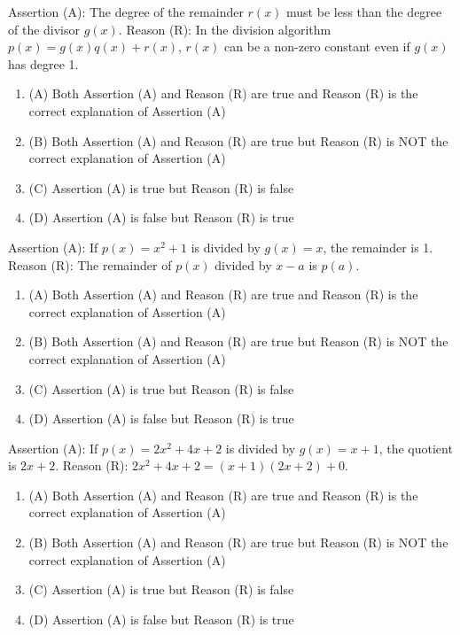 \documentclass[12pt,a4paper]{exam}
\begin{document}
\begin{questions}
\question[1] Assertion (A): The degree of the remainder $r(x)$ must be less than the degree of the divisor $g(x)$. Reason (R): In the division algorithm $p(x) = g(x)q(x) + r(x)$, $r(x)$ can be a non-zero constant even if $g(x)$ has degree 1.
\begin{enumerate}[label=(\Alph*)]
  \item (A) Both Assertion (A) and Reason (R) are true and Reason (R) is the correct explanation of Assertion (A)
  \item (B) Both Assertion (A) and Reason (R) are true but Reason (R) is NOT the correct explanation of Assertion (A)
  \item (C) Assertion (A) is true but Reason (R) is false
  \item (D) Assertion (A) is false but Reason (R) is true
\end{enumerate}
\vspace{0.15cm}

\question[1] Assertion (A): If $p(x) = x^2 + 1$ is divided by $g(x) = x$, the remainder is 1. Reason (R): The remainder of $p(x)$ divided by $x-a$ is $p(a)$.
\begin{enumerate}[label=(\Alph*)]
  \item (A) Both Assertion (A) and Reason (R) are true and Reason (R) is the correct explanation of Assertion (A)
  \item (B) Both Assertion (A) and Reason (R) are true but Reason (R) is NOT the correct explanation of Assertion (A)
  \item (C) Assertion (A) is true but Reason (R) is false
  \item (D) Assertion (A) is false but Reason (R) is true
\end{enumerate}
\vspace{0.15cm}

\question[1] Assertion (A): If $p(x) = 2x^2 + 4x + 2$ is divided by $g(x) = x+1$, the quotient is $2x+2$. Reason (R): $2x^2 + 4x + 2 = (x+1)(2x+2) + 0$.
\begin{enumerate}[label=(\Alph*)]
  \item (A) Both Assertion (A) and Reason (R) are true and Reason (R) is the correct explanation of Assertion (A)
  \item (B) Both Assertion (A) and Reason (R) are true but Reason (R) is NOT the correct explanation of Assertion (A)
  \item (C) Assertion (A) is true but Reason (R) is false
  \item (D) Assertion (A) is false but Reason (R) is true
\end{enumerate}
\vspace{0.15cm}


\end{questions}
\end{document}
